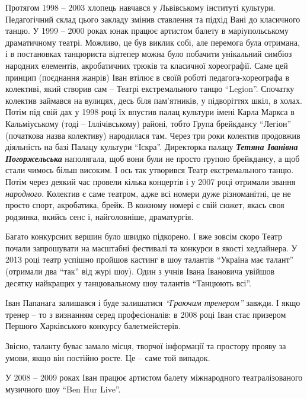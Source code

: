 
Протягом 1998 – 2003 хлопець навчався у Львівському інституті культури.
Педагогічний склад цього закладу змінив ставлення та підхід Вані до класичного
танцю. У 1999 – 2000 роках юнак працює артистом балету в маріупольському
драматичному театрі. Можливо, це був виклик собі, але перемога була отримана, і
в постановках танцюриста відтепер можна було побачити унікальний симбіоз
народних елементів, акробатичних трюків та класичної хореографії. Саме цей
принцип (поєднання жанрів) Іван втілює в своїй роботі педагога-хореографа в
колективі, який створив сам – Театрі екстремального танцю \enquote{Legion}. Спочатку
колектив займався на вулицях, десь біля пам'ятників, у підворіттях шкіл, в
холах. Потім під свій дах у 1998 році їх впустив палац культури імені Карла
Маркса в Кальміуському (тоді – Іллічівському) районі, тобто Група брейкдансу
\enquote{Легіон} (початкова назва колективу) народилася там. Через три роки колектив
продовжив діяльність на базі Палацу культури \enquote{Іскра}. Директорка палацу \textbf{\emph{Тетяна
Іванівна Погоржельська}} наполягала, щоб вони були не просто групою брейкдансу, а
щоб стали чимось більш високим. І ось так утворився Театр екстремального танцю.
Потім через деякий час провели кілька концертів і у 2007 році отримали звання
\emph{народного}. Колектив є саме театром, адже всі номери дуже різноманітні, це не
просто спорт, акробатика, брейк. В кожному номері є свій сюжет, якась своя
родзинка, якийсь сенс і, найголовніше, драматургія.

Багато конкурсних вершин було швидко підкорено. І вже зовсім скоро Театр почали
запрошувати на масштабні фестивалі та конкурси в якості хедлайнера. У 2013 році
театр успішно пройшов кастинг в шоу талантів \enquote{Україна має талант} (отримали два
\enquote{так} від журі шоу). Один з учнів Івана Івановича увійшов  десятку найкращих у
танцювальному шоу талантів \enquote{Танцюють всі}.


Іван Папанага залишався і буде залишатися \emph{\enquote{Граючим тренером}} завжди. І якщо
тренер – то з визнанням серед професіоналів: в 2008 році Іван стає призером
Першого Харківського конкурсу балетмейстерів.

Звісно, таланту буває замало місця, творчої інформації та простору прояву за
умови, якщо він постійно росте. Це – саме той випадок.

У 2008 – 2009 роках Іван працює артистом балету міжнародного театралізованого
музичного шоу \enquote{Ben Hur Live}.

